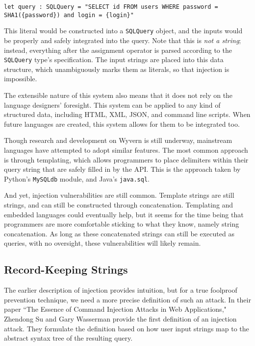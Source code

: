 \documentclass[twocolumn]{article}
\begin{document}
\begin{lstlisting}[language=Wyvern, frame=single]
let query : SQLQuery = "SELECT id FROM users WHERE password = SHA1({password}) and login = {login}"
\end{lstlisting}

This literal would be constructed into a \verb;SQLQuery; object, and the inputs would be properly and safely integrated into the query.  Note that this is \emph{not a string}; instead, everything after the assignment operator is parsed according to the \verb;SQLQuery; type's specification.  The input strings are placed into this data structure, which unambiguously marks them as literals, so that injection is impossible.

The extensible nature of this system also means that it does not rely on the language designers' foresight.  This system can be applied to any kind of structured data, including HTML, XML, JSON, and command line scripts.  When future languages are created, this system allows for them to be integrated too.\cite{wyvern-long}

Though research and development on Wyvern is still underway, mainstream languages have attempted to adopt similar features.  The most common approach is through templating, which allows programmers to place delimiters within their query string that are safely filled in by the API.  This is the approach taken by Python's \verb;MySQLdb; module, and Java's \verb;java.sql;.

And yet, injection vulnerabilities are still common.  Template strings are still strings, and can still be constructed through concatenation.  Templating and embedded languages could eventually help, but it seems for the time being that programmers are more comfortable sticking to what they know, namely string concatenation.  As long as these concatenated strings can still be executed as queries, with no oversight, these vulnerabilities will likely remain.

\subsection{Record-Keeping Strings}
The earlier description of injection provides intuition, but for a true foolproof prevention technique, we need a more precise definition of such an attack.  In their paper ``The Essence of Command Injection Attacks in Web Applications," Zhendong Su and Gary Wasserman provide the first definition of an injection attack.  They formulate the definition based on how user input strings map to the abstract syntax tree of the resulting query.\cite{su2006}
\end{document}
